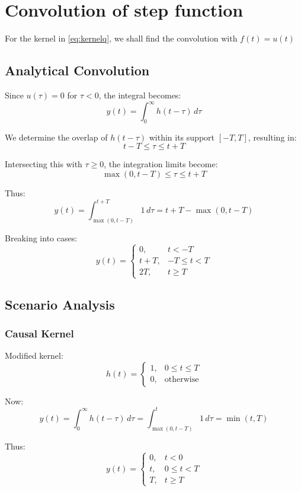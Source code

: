 \section{Convolution of step function}

For the kernel in \eqref{eq:kernelq}, we shall find the convolution with $f(t) = u(t)$

\subsection{Analytical Convolution}

Since \( u(\tau) = 0 \) for \( \tau < 0 \), the integral becomes:
\[
y(t) = \int_0^{\infty} h(t - \tau) \, d\tau
\]

We determine the overlap of \( h(t - \tau) \) within its support \( [-T, T] \), resulting in:
\[
t - T \le \tau \le t + T
\]

Intersecting this with \( \tau \ge 0 \), the integration limits become:
\[
\max(0, t - T) \le \tau \le t + T
\]

Thus:
\[
y(t) = \int_{\max(0, t - T)}^{t + T} 1 \, d\tau = t + T - \max(0, t - T)
\]

Breaking into cases:
\[
y(t) =
\begin{cases}
0, & t < -T \\
t + T, & -T \le t < T \\
2T, & t \ge T
\end{cases}
\]

\subsection{Scenario Analysis}

\subsubsection{Causal Kernel}
Modified kernel:
\[
h(t) =
\begin{cases}
1, & 0 \le t \le T \\
0, & \text{otherwise}
\end{cases}
\]

Now:
\[
y(t) = \int_0^\infty h(t - \tau) \, d\tau
= \int_{\max(0, t - T)}^{t} 1 \, d\tau = \min(t, T)
\]

Thus:
\[
y(t) =
\begin{cases}
0, & t < 0 \\
t, & 0 \le t < T \\
T, & t \ge T
\end{cases}
\]

